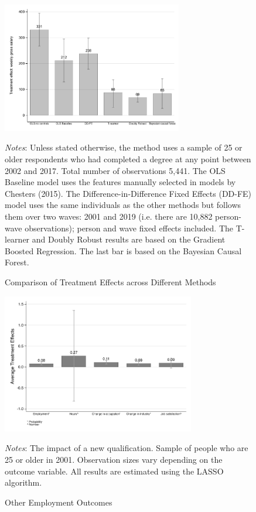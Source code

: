 \documentclass[12pt, a4paper]{article}
\begin{document}

\begin{figure}[H]
\centering
\caption{Comparison of Treatment Effects across Different Methods}
\vspace{0.5cm}
  \label{fig:method}
    \includegraphics[width=0.7\textwidth]{_figures/method_v2.pdf}
\parbox{1\textwidth}{\footnotesize{\textit{Notes}: Unless stated otherwise, the method uses a sample of 25 or older respondents who had completed a degree at any point between 2002 and 2017. Total number of observations 5,441. The OLS Baseline model uses the features manually selected in models by Chesters (2015). The Difference-in-Difference Fixed Effects (DD-FE) model uses the same individuals as the other methods but follows them over two waves: 2001 and 2019 (i.e. there are 10,882 person-wave observations); person and wave fixed effects included. The T-learner and Doubly Robust results are based on the Gradient Boosted Regression. The last bar is based on the Bayesian Causal Forest.}}
\end{figure}

\begin{figure}[H]
\centering
\caption{Other Employment Outcomes}
\vspace{0.5cm}
  \label{fig:empl}
    \includegraphics[width=0.75\textwidth]{_figures/SPRC_fig5_empltr.pdf}
\parbox{1\textwidth}{\footnotesize{\textit{Notes}: The impact of a new qualification. Sample of people who are 25 or older in 2001. Observation sizes vary depending on the outcome variable. All results are estimated using the LASSO algorithm.}}
\end{figure}
\end{document}
